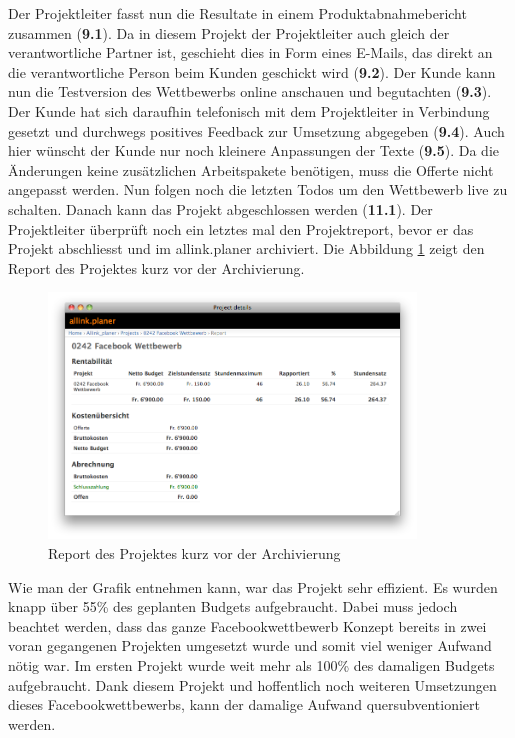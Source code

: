 Der Projektleiter fasst nun die Resultate in einem Produktabnahmebericht 
zusammen (\textbf{9.1}). Da in diesem Projekt der Projektleiter auch gleich der 
verantwortliche Partner ist, geschieht dies in Form eines E-Mails, das direkt an 
die verantwortliche Person beim Kunden geschickt wird (\textbf{9.2}). Der Kunde 
kann nun die Testversion des Wettbewerbs online anschauen und begutachten (\textbf{9.3}).
Der Kunde hat sich daraufhin telefonisch mit dem Projektleiter in Verbindung
gesetzt und durchwegs positives Feedback zur Umsetzung abgegeben (\textbf{9.4}).
Auch hier wünscht der Kunde nur noch kleinere Anpassungen der Texte (\textbf{9.5}).
Da die Änderungen keine zusätzlichen Arbeitspakete benötigen, muss die Offerte
nicht angepasst werden. Nun folgen noch die letzten Todos um den Wettbewerb live 
zu schalten. Danach kann das Projekt abgeschlossen werden (\textbf{11.1}).
Der Projektleiter überprüft noch ein letztes mal den Projektreport, bevor er
das Projekt abschliesst und im allink.planer archiviert. Die Abbildung \ref{pic:allink_planer_report_ende}
zeigt den Report des Projektes kurz vor der Archivierung.

\begin{figure}[htbp]
\begin{center}
\includegraphics[width=0.87\textwidth,angle=0]{./bilder/proof_of_concept/allink_planer_report_ende.png}
\caption[Report des Projektes kurz vor der Archivierung]{Report des Projektes 
    kurz vor der Archivierung\footnotemark}
\label{pic:allink_planer_report_ende}
\end{center}
\end{figure}

Wie man der Grafik entnehmen kann, war das Projekt sehr effizient. Es wurden knapp
über 55\% des geplanten Budgets aufgebraucht. Dabei muss jedoch beachtet werden,
dass das ganze Facebookwettbewerb Konzept bereits in zwei voran gegangenen Projekten
umgesetzt wurde und somit viel weniger Aufwand nötig war. Im ersten Projekt
wurde weit mehr als 100\% des damaligen Budgets aufgebraucht. Dank diesem
Projekt und hoffentlich noch weiteren Umsetzungen dieses Facebookwettbewerbs,
kann der damalige Aufwand quersubventioniert werden.

